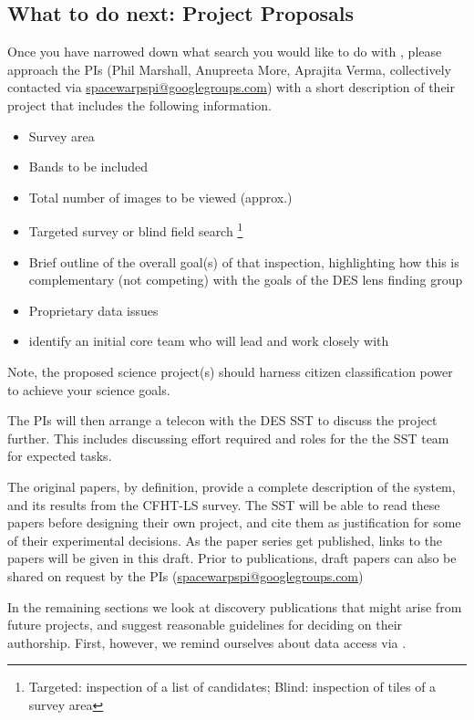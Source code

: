 \documentclass[a4paper,twocolumn]{article}
\begin{document}
\subsection{What to do next: Project Proposals}
Once you have narrowed down what search you would like to do with \SW, please approach the \SW PIs (Phil Marshall, Anupreeta More, Aprajita Verma, collectively contacted via \href{mailto:spacewarpspi@googlegroups.com}{spacewarpspi@googlegroups.com}) with a short description of their project that includes the following information.

\begin{itemize}
\item Survey area
\item Bands to be included
\item Total number of images to be viewed (approx.)
\item Targeted survey or blind field search \footnote{Targeted: inspection of a list of candidates; Blind: inspection of tiles of a survey area}
\item Brief outline of the overall goal(s) of that inspection, highlighting how this is complementary (not competing) with the goals of the DES lens finding group
\item Proprietary data issues 
\item identify an initial core team who will lead and work closely with \SW
\end{itemize}

Note, the proposed science project(s) should harness citizen classification power to achieve your science goals.

The \SW PIs will then arrange a telecon with the DES SST to discuss the project further. This includes discussing effort required and roles for the the SST team for expected tasks.

The original \SW papers, by definition, provide a complete description of the system, and its results from the CFHT-LS survey. The SST will be able
to read these papers before designing their own \SW project, and cite them as justification for some of their experimental decisions. As the \SW paper series get published, links to the papers will be given in this draft. Prior to publications, draft papers can also be shared on request by the \SW PIs (\href{mailto:spacewarpspi@googlegroups.com}{spacewarpspi@googlegroups.com})


In the remaining sections we look at discovery publications that might
arise from future \SW projects, and suggest reasonable guidelines for
deciding on their authorship. First, however, we remind ourselves about data
access via \SW.
\end{document}
